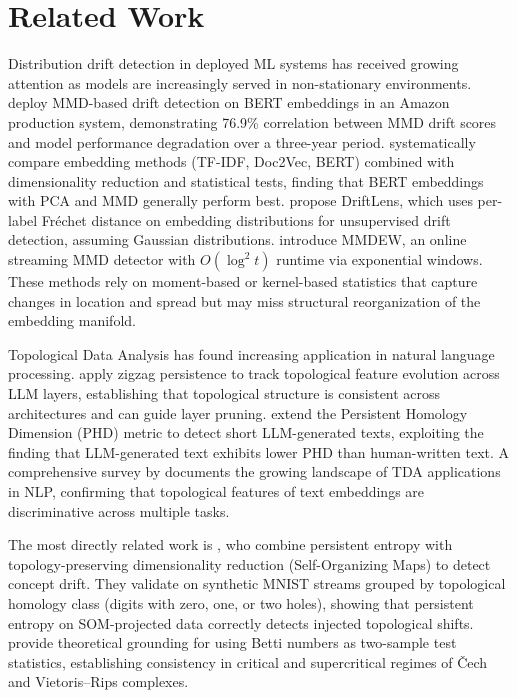 \section{Related Work}
\label{sec:related}

Distribution drift detection in deployed ML systems has received growing attention as models are increasingly served in non-stationary environments. \citet{khaki2023uncovering} deploy MMD-based drift detection on BERT embeddings in an Amazon production system, demonstrating 76.9\% correlation between MMD drift scores and model performance degradation over a three-year period. \citet{sodar2023detecting} systematically compare embedding methods (TF-IDF, Doc2Vec, BERT) combined with dimensionality reduction and statistical tests, finding that BERT embeddings with PCA and MMD generally perform best. \citet{greco2024driftlens} propose DriftLens, which uses per-label Fr\'{e}chet distance on embedding distributions for unsupervised drift detection, assuming Gaussian distributions. \citet{kalinke2022mmdew} introduce MMDEW, an online streaming MMD detector with $O(\log^2 t)$ runtime via exponential windows. These methods rely on moment-based or kernel-based statistics that capture changes in location and spread but may miss structural reorganization of the embedding manifold.

Topological Data Analysis has found increasing application in natural language processing. \citet{gardinazzi2024persistent} apply zigzag persistence to track topological feature evolution across LLM layers, establishing that topological structure is consistent across architectures and can guide layer pruning. \citet{wei2025shortphd} extend the Persistent Homology Dimension (PHD) metric to detect short LLM-generated texts, exploiting the finding that LLM-generated text exhibits lower PHD than human-written text. A comprehensive survey by \citet{chen2024tdasurvey} documents the growing landscape of TDA applications in NLP, confirming that topological features of text embeddings are discriminative across multiple tasks.

The most directly related work is \citet{basterrech2024unsupervised}, who combine persistent entropy with topology-preserving dimensionality reduction (Self-Organizing Maps) to detect concept drift. They validate on synthetic MNIST streams grouped by topological homology class (digits with zero, one, or two holes), showing that persistent entropy on SOM-projected data correctly detects injected topological shifts. \citet{bobrowski2022testing} provide theoretical grounding for using Betti numbers as two-sample test statistics, establishing consistency in critical and supercritical regimes of \v{C}ech and Vietoris--Rips complexes.

